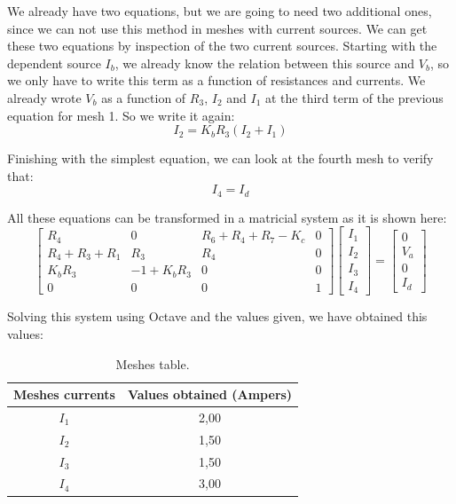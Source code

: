 \noindent We already have two equations, but we are going to need two additional ones, since we can not use this method in meshes with current sources. We can get these two equations by inspection of the two current sources. Starting with the dependent source $I_b$, we already  know the relation between this source and $V_b$, so we only have to write this term as a function of resistances and currents. We already wrote $V_b$ as a function of $R_3$, $I_2$ and $I_1$ at the third term of the previous equation for mesh 1. So we write it again:
\begin{equation}
I_2 = K_bR_3(I_2+I_1)
  \label{eq:kcl_mesh2}
\end{equation}

\noindent Finishing with the simplest equation, we can look at the fourth mesh to verify that:
\begin{equation}
I_4 = I_d
  \label{eq:kvl_kcl_mesh4}
\end{equation}

\noindent All these equations can be transformed in a matricial system as it is shown here:
$$ \left[ \begin{array}{cccc} R_4 & 0 & R_6 + R_4 + R_7- K_c  & 0\\
R_4 + R_3 + R_1   & R_3  &  R_4  & 0 \\
K_bR_3 & -1 + K_bR_3 & 0 & 0 \\
 0 & 0 & 0 & 1 \end{array} \right]
\left[ \begin{array}{c} I_1 \\ I_2 \\ I_3 \\ I_4\end{array} \right] = 
\left[ \begin{array}{c} 0 \\ V_a \\ 0 \\ I_d \end{array} \right] $$

\noindent Solving this system using Octave and the values given, we have obtained this values:
\begin{table}[h!]
\centering
\begin{small}
\caption{Meshes table.} \label{Table2}
\begin{tabular}{c|c}
\hline
Meshes currents & Values obtained (Ampers)\\
\hline
$I_1$           & 2,00 \\
$I_2$  & 1,50 \\
$I_3$         & 1,50 \\
$I_4$   & 3,00 \\
\hline
\end{tabular}
\end{small}
\end{table}

